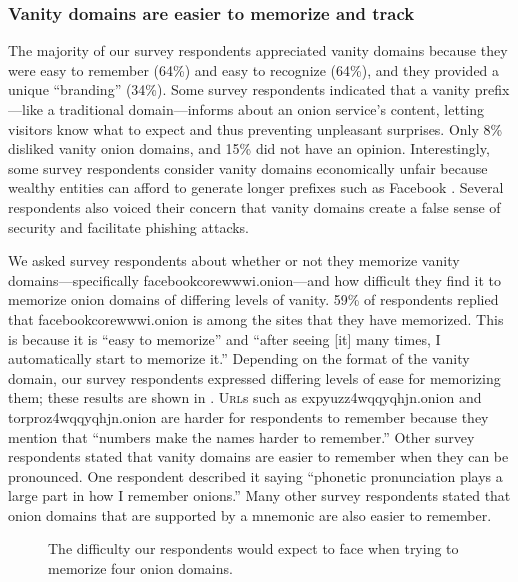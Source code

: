 \subsubsection{Vanity domains are easier to memorize and track}
The majority of our survey respondents appreciated vanity domains because they were easy
to remember (64\%) and easy to recognize (64\%), and they provided a unique
``branding'' (34\%).  Some survey respondents indicated that a vanity prefix---like a
traditional domain---informs about an onion service's content, letting visitors
know what to expect and thus preventing unpleasant surprises.  Only 8\% disliked
vanity onion domains, and 15\% did not have an opinion.  Interestingly, some survey
respondents consider vanity domains economically unfair because wealthy entities
can afford to generate longer prefixes such as Facebook .  Several respondents also voiced their
concern that vanity domains create a false sense of security and facilitate
phishing attacks. 




We asked survey respondents
about whether or not they memorize vanity domains---specifically
facebookcorewwwi.onion---and how difficult they find it to memorize onion
domains of differing levels of vanity.  59\% of respondents replied that
facebookcorewwwi.onion is among the sites that they have memorized.  This is 
because it is ``easy to memorize'' and ``after seeing [it] many times, I
automatically start to memorize it.'' Depending on the format of the vanity domain, our survey respondents expressed differing levels of ease for
memorizing them; these results are shown in .
\textsc{Url}s such as expyuzz4wqqyqhjn.onion and torproz4wqqyqhjn.onion are
harder for respondents to remember because they mention that ``numbers make the
names harder to remember.''  Other survey respondents stated that vanity domains are easier to
remember when they can be pronounced.  One respondent described it saying 
``phonetic pronunciation plays a large part in how I remember onions.'' Many
other survey respondents stated that onion domains that are supported by a mnemonic are
also easier to remember.  

\begin{figure}[t]
    \centering
    
    \caption{The difficulty our respondents would expect to face when trying to
    memorize four onion domains.}
    \label{fig:memorize-domains}
\end{figure}

